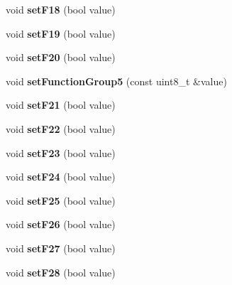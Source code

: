\begin{DoxyCompactItemize}
\mbox{\label{classTBT_1_1LocDecoder_aae4349cafcf17f8530ce151507bf3cf3}} 
void {\bfseries set\+F18} (bool value)
\item 
\mbox{\label{classTBT_1_1LocDecoder_a4625176dfddd8495f7a11be4b9dd29bf}} 
void {\bfseries set\+F19} (bool value)
\item 
\mbox{\label{classTBT_1_1LocDecoder_a04a0514ad5b63714ca5774cf3c2e277c}} 
void {\bfseries set\+F20} (bool value)
\item 
\mbox{\label{classTBT_1_1LocDecoder_a30659350a469bda322d276ee17b1b89c}} 
void {\bfseries set\+Function\+Group5} (const uint8\+\_\+t \&value)
\item 
\mbox{\label{classTBT_1_1LocDecoder_ab5d79049ab7e38b4d408c9627db99a6d}} 
void {\bfseries set\+F21} (bool value)
\item 
\mbox{\label{classTBT_1_1LocDecoder_a7dc0125781c063f15dda51d03ec3e25d}} 
void {\bfseries set\+F22} (bool value)
\item 
\mbox{\label{classTBT_1_1LocDecoder_a7b5a668ba542b1d8a8b47064be1f5c5a}} 
void {\bfseries set\+F23} (bool value)
\item 
\mbox{\label{classTBT_1_1LocDecoder_a3c44b57443b1d600380ccf8e55da23e5}} 
void {\bfseries set\+F24} (bool value)
\item 
\mbox{\label{classTBT_1_1LocDecoder_aafefc743964ea0b01ff3ad51fee98033}} 
void {\bfseries set\+F25} (bool value)
\item 
\mbox{\label{classTBT_1_1LocDecoder_a646c6edc6515dadaebac9b06a0907a9e}} 
void {\bfseries set\+F26} (bool value)
\item 
\mbox{\label{classTBT_1_1LocDecoder_a7584ffb3eaf00b83b48217081049ff59}} 
void {\bfseries set\+F27} (bool value)
\item 
\mbox{\label{classTBT_1_1LocDecoder_a66c6f1dcd471f19d019018ed3eed2e0f}} 
void {\bfseries set\+F28} (bool value)
\end{DoxyCompactItemize}
